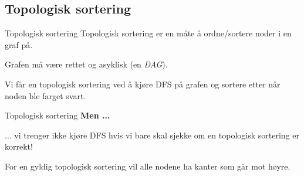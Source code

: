 \documentclass[14pt]{beamer}
\begin{document}
\subsection{Topologisk sortering}
\begin{frame}{Topologisk sortering}
    Topologisk sortering er en måte å ordne/sortere noder i en graf på.

    \pause

    Grafen må være rettet og asyklisk (en \textit{DAG}).

    \pause

    Vi får en topologisk sortering ved å kjøre DFS på grafen og sortere etter når noden ble farget svart.
\end{frame}
\begin{frame}{Topologisk sortering}
    \textbf{Men ...}

    \pause

    ... vi trenger ikke kjøre DFS hvis vi bare skal sjekke om en topologisk sortering er korrekt!

    \pause

    For en gyldig topologisk sortering vil alle nodene ha kanter som går mot høyre.
\end{frame}
\end{document}
